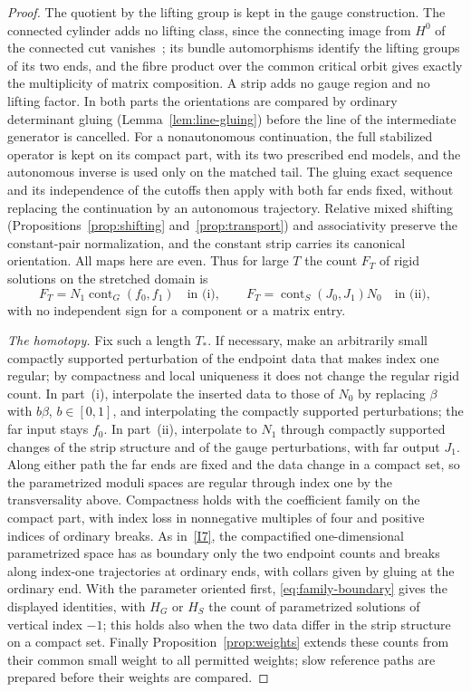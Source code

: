 \documentclass[11pt]{amsart}
\theoremstyle{definition}
\theoremstyle{remark}
\theoremstyle{plain}
\numberwithin{equation}{section}
\newcommand{\cont}{\operatorname{cont}}
\begin{document}
\begin{proof}
The quotient by the lifting group is kept in the gauge construction.
The connected cylinder adds no lifting class, since the connecting image from $H^0$ of the connected cut vanishes~\cite[Proposition~5.4]{KM-unknot}; its bundle
automorphisms identify the lifting groups of its two ends, and the
fibre product over the common critical orbit gives exactly the
multiplicity of matrix composition. A strip adds no gauge region and
no lifting factor. In both parts the orientations are compared by
ordinary determinant gluing (Lemma~\ref{lem:line-gluing}) before the
line of the intermediate generator is cancelled. For a nonautonomous
continuation, the full stabilized operator is kept on its compact part,
with its two prescribed end models, and the autonomous inverse is used
only on the matched tail. The gluing exact sequence and its
independence of the cutoffs then apply with both far ends fixed,
without replacing the continuation by an autonomous trajectory.
Relative mixed shifting (Propositions~\ref{prop:shifting}
and~\ref{prop:transport}) and associativity preserve the
constant-pair normalization, and the constant strip carries its
canonical orientation. All maps here are even. Thus for large $T$ the count $F_T$ of rigid solutions on the stretched domain is
\[
 F_T=N_1\cont_G(f_0,f_1)\quad\text{in (i)},\qquad
 F_T=\cont_S(J_0,J_1)N_0\quad\text{in (ii)},
\]
with no independent sign for a component or a matrix entry.

\emph{The homotopy.} Fix such a length $T_*$. If necessary, make an
arbitrarily small compactly supported perturbation of the endpoint
data that makes index one regular; by compactness and local uniqueness
it does not change the regular rigid count. In part~(i), interpolate
the inserted data to those of $N_0$ by replacing $\beta$ with
$b\beta$, $b\in[0,1]$, and interpolating the compactly supported
perturbations; the far input stays $f_0$. In part~(ii), interpolate to
$N_1$ through compactly supported changes of the strip structure and
of the gauge perturbations, with far output $J_1$. Along either path
the far ends are fixed and the data change in a compact set, so the
parametrized moduli spaces are regular through index one by the
transversality above. Compactness holds with the coefficient family on
the compact part, with index loss in nonnegative multiples of four and
positive indices of ordinary breaks. As in~\ref{I7}, the compactified
one-dimensional parametrized space has as boundary only the two
endpoint counts and breaks along index-one trajectories at ordinary
ends, with collars given by gluing at the ordinary end. With the
parameter oriented first, \eqref{eq:family-boundary} gives the
displayed identities, with $H_G$ or $H_S$ the count of parametrized
solutions of vertical index $-1$; this holds also when the two data
differ in the strip structure on a compact set. Finally
Proposition~\ref{prop:weights} extends these counts from their common
small weight to all permitted weights; slow reference paths are
prepared before their weights are compared.
\end{proof}
\end{document}
